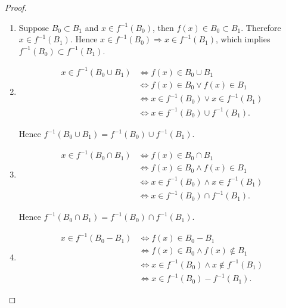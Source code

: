 \begin{proof}
    \begin{enumerate}[label={(\alph*)}]
        \item Suppose $B_{0}\subset B_{1}$ and $x\in f^{-1}(B_{0})$, then $f(x)\in B_{0}\subset B_{1}$. Therefore $x\in f^{-1}(B_{1})$. Hence $x\in f^{-1}(B_{0})\Rightarrow x\in f^{-1}(B_{1})$, which implies $f^{-1}(B_{0})\subset f^{-1}(B_{1})$.
        \item \begin{align*}
                  x\in f^{-1}(B_{0}\cup B_{1}) & \Longleftrightarrow f(x) \in B_{0}\cup B_{1}                   \\
                                               & \Longleftrightarrow f(x)\in B_{0} \lor f(x)\in B_{1}           \\
                                               & \Longleftrightarrow x\in f^{-1}(B_{0}) \lor x\in f^{-1}(B_{1}) \\
                                               & \Longleftrightarrow x\in f^{-1}(B_{0})\cup f^{-1}(B_{1}).
              \end{align*}

              Hence $f^{-1}(B_{0}\cup B_{1}) = f^{-1}(B_{0}) \cup f^{-1}(B_{1})$.
        \item \begin{align*}
                  x\in f^{-1}(B_{0}\cap B_{1}) & \Longleftrightarrow f(x) \in B_{0}\cap B_{1}                    \\
                                               & \Longleftrightarrow f(x)\in B_{0} \land f(x)\in B_{1}           \\
                                               & \Longleftrightarrow x\in f^{-1}(B_{0}) \land x\in f^{-1}(B_{1}) \\
                                               & \Longleftrightarrow x\in f^{-1}(B_{0})\cap f^{-1}(B_{1}).
              \end{align*}

              Hence $f^{-1}(B_{0}\cap B_{1}) = f^{-1}(B_{0}) \cap f^{-1}(B_{1})$.
        \item \begin{align*}
                  x\in f^{-1}(B_{0} - B_{1}) & \Longleftrightarrow f(x) \in B_{0} - B_{1}                           \\
                                             & \Longleftrightarrow f(x) \in B_{0} \land f(x)\notin B_{1}            \\
                                             & \Longleftrightarrow x \in f^{-1}(B_{0}) \land x \notin f^{-1}(B_{1}) \\
                                             & \Longleftrightarrow x\in f^{-1}(B_{0}) - f^{-1}(B_{1}).
              \end{align*}


\end{enumerate}
\end{proof}
